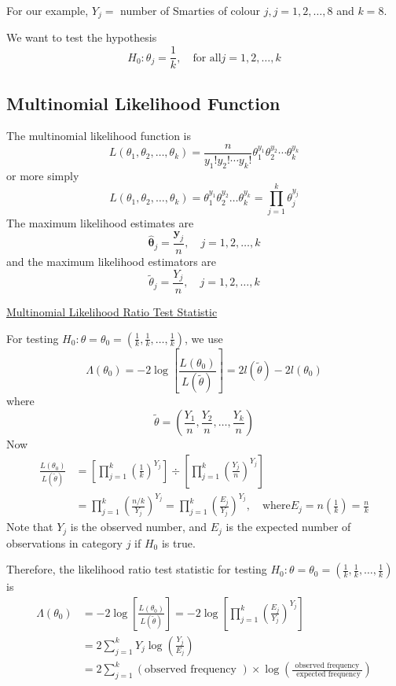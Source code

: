 For our example, $Y_{j}=$ number of Smarties of colour $j, j=1,2, \ldots, 8$ and $k=8$.

We want to test the hypothesis
\[ H_{0}: \theta_{j}=\frac{1}{k}, \quad \text{for all} j=1,2, \ldots, k \]

\subsection{Multinomial Likelihood Function}
The multinomial likelihood function is
\[
    L\left(\theta_{1}, \theta_{2}, \ldots, \theta_{k}\right)=\frac{n}{y_{1} ! y_{2} ! \cdots y_{k} !} \theta_{1}^{y_{1}} \theta_{2}^{y_{2}} \cdots \theta_{k}^{y_{k}}
\]
or more simply
\[
    L\left(\theta_{1}, \theta_{2}, \ldots, \theta_{k}\right)=\theta_{1}^{y_{1}} \theta_{2}^{y_{2}} \ldots \theta_{k}^{y_{k}}=\prod_{j=1}^{k} \theta_{j}^{y_{j}}
\]
The maximum likelihood estimates are
\[
    \hat{\symbf{\theta}}_{j}=\frac{\symbf{y}_{j}}{n}, \quad j=1,2, \ldots, k
\]
and the maximum likelihood estimators are
\[
    \tilde{\theta}_{j}=\frac{Y_{j}}{n}, \quad j=1,2, \ldots, k
\]

\underline{Multinomial Likelihood Ratio Test Statistic}

For testing $H_{0}: \theta=\theta_{0}=\left(\frac{1}{k}, \frac{1}{k}, \ldots, \frac{1}{k}\right)$, we use
\[
    \Lambda\left(\theta_{0}\right)=-2 \log \left[\frac{L\left(\theta_{0}\right)}{L(\tilde{\theta})}\right]=2 l(\tilde{\theta})-2 l\left(\theta_{0}\right)
\]
where
\[
    \tilde{\theta}=\left(\frac{Y_{1}}{n}, \frac{Y_{2}}{n}, \ldots, \frac{Y_{k}}{n}\right)
\]
Now
\[
    \begin{aligned}
        \frac{L\left(\theta_{0}\right)}{L(\tilde{\theta})} & =\left[\prod_{j=1}^{k}\left(\frac{1}{k}\right)^{Y_{j}}\right] \div\left[\prod_{j=1}^{k}\left(\frac{Y_{j}}{n}\right)^{Y_{j}}\right]                                               \\
                                                           & =\prod_{j=1}^{k}\left(\frac{n / k}{Y_{j}}\right)^{Y_{j}}=\prod_{j=1}^{k}\left(\frac{E_{j}}{Y_{j}}\right)^{Y_{j}}, \quad \text{where} E_{j}=n\left(\frac{1}{k}\right)=\frac{n}{k}
    \end{aligned}
\]
Note that $Y_{j}$ is the observed number, and $E_{j}$ is the expected number of observations in category $j$ if $H_{0}$ is true.

Therefore, the likelihood ratio test statistic for testing $H_{0}: \theta=\theta_{0}=\left(\frac{1}{k}, \frac{1}{k}, \ldots, \frac{1}{k}\right)$ is
\[
    \begin{aligned}
        \Lambda\left(\theta_{0}\right) & =-2 \log \left[\frac{L\left(\theta_{0}\right)}{L(\tilde{\theta})}\right]=-2 \log \left[\prod_{j=1}^{k}\left(\frac{E_{j}}{Y_{j}}\right)^{Y_{j}}\right] \\
                                       & =2 \sum_{j=1}^{k} Y_{j} \log \left(\frac{Y_{j}}{E_{j}}\right)                                                                                         \\
                                       & =2 \sum_{j=1}^{k}(\text{observed frequency }) \times \log \left(\frac{\text{ observed frequency }}{\text{ expected frequency}}\right)
    \end{aligned}
\]

